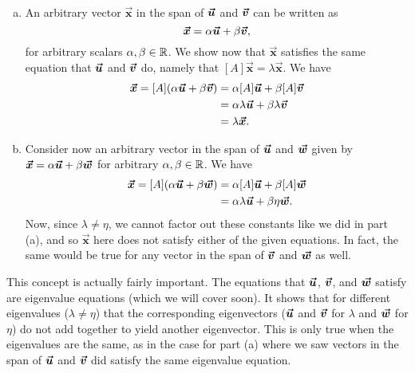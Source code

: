 \documentclass[12pt]{article} %
\newcommand{\vecx}{\boldsymbol{\vec{x}}}
\begin{document}
\begin{solution}~
    \begin{enumerate}[(a)]
        \item An arbitrary vector $\vecx$ in the span of $\boldsymbol{\boldsymbol{\vec{u}}}$ and $\boldsymbol{\boldsymbol{\vec{v}}}$ can be written as
        \[
        \vecx = \alpha \vecu + \beta \vecv,
        \]
        for arbitrary scalars $\alpha,\beta \in \mathbb{R}$.  We show now that $\vecx$ satisfies the same equation that $\boldsymbol{\boldsymbol{\vec{u}}}$ and $\boldsymbol{\boldsymbol{\vec{v}}}$ do, namely that $[A]\vecx = \lambda \vecx$.  We have
        \begin{align*}
                [A]\vecx = [A](\alpha \vecu + \beta \vecv) &= \alpha [A]\vecu + \beta [A]\vecv\\
                &= \alpha \lambda \vecu + \beta \lambda \vecv\\
                &= \lambda \vecx.
        \end{align*}
        
        \item Consider now an arbitrary vector in the span of $\boldsymbol{\boldsymbol{\vec{u}}}$ and $\boldsymbol{\boldsymbol{\vec{w}}}$ given by $\vecx = \alpha \vecu + \beta \vecw$ for arbitrary $\alpha,\beta \in \mathbb{R}$.  We have
        \begin{align*}
            [A]\vecx = [A](\alpha\vecu + \beta \vecw) &= \alpha [A]\vecu + \beta [A]\vecw\\
            &= \alpha \lambda \vecu + \beta \eta \vecw.
        \end{align*}
        Now, since $\lambda \neq \eta$, we cannot factor out these constants like we did in part (a), and so $\vecx$ here does not satisfy either of the given equations.  In fact, the same would be true for any vector in the span of $\boldsymbol{\boldsymbol{\vec{v}}}$ and $\boldsymbol{\boldsymbol{\vec{w}}}$ as well.  
    \end{enumerate}
\begin{remark}
    This concept is actually fairly important.  The equations that $\boldsymbol{\boldsymbol{\vec{u}}}$, $\boldsymbol{\boldsymbol{\vec{v}}}$, and $\boldsymbol{\boldsymbol{\vec{w}}}$ satisfy are eigenvalue equations (which we will cover soon).  It shows that for different eigenvalues ($\lambda \neq \eta$) that the corresponding eigenvectors ($\boldsymbol{\boldsymbol{\vec{u}}}$ and $\boldsymbol{\boldsymbol{\vec{v}}}$ for $\lambda$ and $\boldsymbol{\boldsymbol{\vec{w}}}$ for $\eta$) do not add together to yield another eigenvector. This is only true when the eigenvalues are the same, as in the case for part (a) where we saw vectors in the span of $\boldsymbol{\boldsymbol{\vec{u}}}$ and $\boldsymbol{\boldsymbol{\vec{v}}}$ did satisfy the same eigenvalue equation.
\end{remark}
\end{solution}
\end{document}

